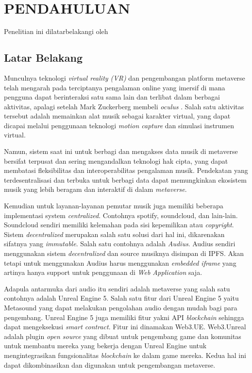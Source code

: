 \chapter{PENDAHULUAN}
\label{chap:pendahuluan}


Penelitian ini dilatarbelakangi oleh \lipsum[1][1-5]

\section{Latar Belakang}
\label{sec:latarbelakang}

Munculnya teknologi \emph{virtual reality (VR)} dan pengembangan platform metaverse telah mengarah pada terciptanya
pengalaman online yang imersif di mana pengguna dapat berinteraksi satu sama lain dan terlibat dalam berbagai aktivitas, apalagi setelah  Mark Zuckerberg
membeli \emph{oculus} \parencite{luckerson2014facebook}.
Salah satu aktivitas tersebut adalah memainkan alat musik sebagai karakter virtual, yang dapat dicapai melalui penggunaan
teknologi \emph{motion capture} dan simulasi instrumen virtual.

Namun, sistem saat ini untuk berbagi dan mengakses data musik di metaverse bersifat terpusat dan sering mengandalkan teknologi
hak cipta, yang dapat membatasi fleksibilitas dan interoperabilitas pengalaman musik. Pendekatan yang terdesentralisasi dan terbuka
untuk berbagi data dapat memungkinkan ekosistem musik yang lebih beragam dan interaktif di dalam \emph{metaverse}.

Kemudian untuk layanan-layanan pemutar musik juga memiliki beberapa implementasi system \emph{centralized}. Contohnya spotify, soundcloud, dan lain-lain.
Soundcloud sendiri memiliki kelemahan pada sisi kepemilikan atau \emph{copyright}. Sistem \emph{decentralized} merupakan salah satu solusi dari hal ini, dikarenakan
sifatnya yang \emph{immutable}. Salah satu contohnya adalah \emph{Audius}. Audius sendiri menggunakan sistem \emph{decentralized} dan source musiknya disimpan di IPFS.
Akan tetapi untuk menggunakan Audius harus menggunakan \emph{embedded iframe} yang artinya hanya support untuk penggunaan di \emph{Web Application} saja.

Adapula antarmuka dari audio itu sendiri adalah metaverse yang salah satu contohnya adalah Unreal Engine 5. Salah satu fitur dari Unreal Engine 5
yaitu Metasound yang dapat melakukan pengolahan audio dengan mudah bagi para pengembang. Unreal Engine 5 juga
memiliki fitur yakni API \emph{blockchain} sehingga dapat mengeksekusi \emph{smart contract}. Fitur ini dinamakan Web3.UE. Web3.Unreal adalah plugin
\emph{open source} yang dibuat untuk pengembang game dan komunitas untuk membantu mereka yang bekerja dengan Unreal Engine untuk mengintegrasikan
fungsionalitas \emph{blockchain} ke dalam game mereka. Kedua hal ini dapat dikombinasikan dan digunakan untuk
pengembangan metaverse.

